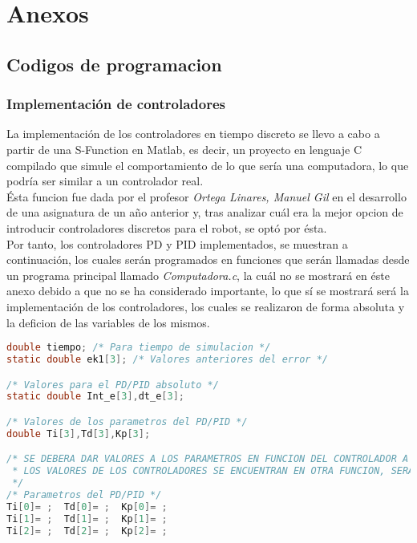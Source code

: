 \section{Anexos}
	\subsection{Codigos de programacion}
		\subsubsection{Implementación de controladores}
La implementación de los controladores en tiempo discreto se llevo a cabo a partir de una S-Function en Matlab, es decir, un proyecto en lenguaje C compilado que simule el comportamiento de lo que sería una computadora, lo que podría ser similar a un controlador real.\\
Ésta funcion fue dada por el profesor \textit{Ortega Linares, Manuel Gil} en el desarrollo de una asignatura de un año anterior y, tras analizar cuál era la mejor opcion de introducir controladores discretos para el robot, se optó por ésta.\\
Por tanto, los controladores PD y PID implementados, se muestran a continuación, los cuales serán programados en funciones que serán llamadas desde un programa principal llamado \textit{Computadora.c}, la cuál no se mostrará en éste anexo debido a que no se ha considerado importante, lo que sí se mostrará será la implementación de los controladores, los cuales se realizaron de forma absoluta y la deficion de las variables de los mismos.\\
\begin{lstlisting}[language=C,style=CStyle, caption={Declaraciones.c}]
double tiempo; /* Para tiempo de simulacion */
static double ek1[3]; /* Valores anteriores del error */

/* Valores para el PD/PID absoluto */
static double Int_e[3],dt_e[3];

/* Valores de los parametros del PD/PID */
double Ti[3],Td[3],Kp[3];

/* SE DEBERA DAR VALORES A LOS PARAMETROS EN FUNCION DEL CONTROLADOR A IMPLEMENTAR.
 * LOS VALORES DE LOS CONTROLADORES SE ENCUENTRAN EN OTRA FUNCION, SERA COPIAR-PEGAR
 */
/* Parametros del PD/PID */
Ti[0]= ;  Td[0]= ;  Kp[0]= ;
Ti[1]= ;  Td[1]= ;  Kp[1]= ;
Ti[2]= ;  Td[2]= ;  Kp[2]= ;
\end{lstlisting}

